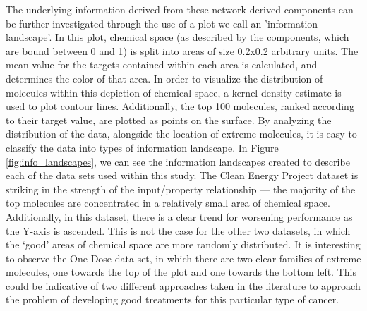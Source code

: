 The underlying information derived from these network derived components can be
further investigated through the use of a plot we call an 'information
landscape'.  In this plot, chemical space (as described by the components,
which are bound between 0 and 1) is split into areas of size 0.2x0.2 arbitrary
units. The mean value for the targets contained within each area is calculated,
and determines the color of that area.  In order to visualize the distribution
of molecules within this depiction of chemical space, a kernel density estimate
is used to plot contour lines.  Additionally, the top 100 molecules, ranked
according to their target value, are plotted as points on the surface.  By
analyzing the distribution of the data, alongside the location of extreme
molecules, it is easy to classify the data into types of information landscape.
In Figure \ref{fig:info_landscapes}, we can see the information landscapes
created to describe each of the data sets used within this study.  The Clean
Energy Project dataset is striking in the strength of the input/property
relationship --- the majority of the top molecules are concentrated in a
relatively small area of chemical space.  Additionally, in this dataset, there
is a clear trend for worsening performance as the Y-axis is ascended.  This is
not the case for the other two datasets, in which the `good' areas of chemical
space are more randomly distributed.  It is interesting to observe the One-Dose
data set, in which there are two clear families of extreme molecules, one
towards the top of the plot and one towards the bottom left.  This could be
indicative of two different approaches taken in the literature to approach the
problem of developing good treatments for this particular type of cancer.

